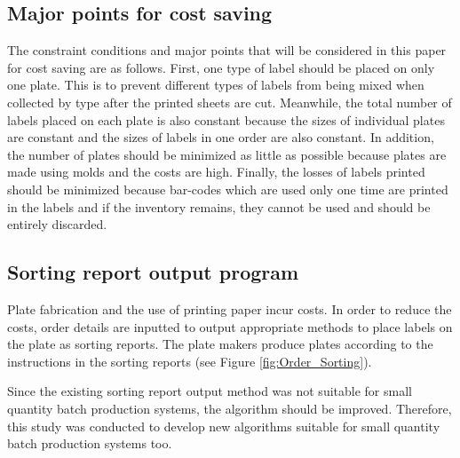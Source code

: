 \subsection{Major points for cost saving}\label{subsec:CostSave}
The constraint conditions and major points that will be considered in this paper for cost saving are as follows. First, one type of label should be placed on only one plate. This is to prevent different types of labels from being mixed when collected by type after the printed sheets are cut. Meanwhile, the total number of labels placed on each plate is also constant because the sizes of individual plates are constant and the sizes of labels in one order are also constant. In addition, the number of plates should be minimized as little as possible because plates are made using molds and the costs are high. Finally, the losses of labels printed should be minimized because bar-codes which are used only one time are printed in the labels and if the inventory remains, they cannot be used and should be entirely discarded.

\subsection{Sorting report output program}\label{subsec:SortProgram}
Plate fabrication and the use of printing paper incur costs. In order to reduce the costs, order details are inputted to output appropriate methods to place labels on the plate as sorting reports. The plate makers produce plates according to the instructions in the sorting reports (see Figure \ref{fig:Order_Sorting}).

Since the existing sorting report output method was not suitable for small quantity batch production systems, the algorithm should be improved. Therefore, this study was conducted to develop new algorithms suitable for small quantity batch production systems too.

